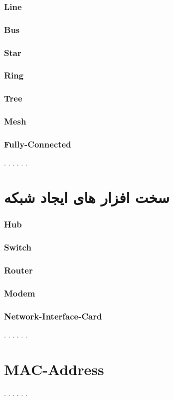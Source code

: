 \documentclass[12pt]{book}
\begin{document}
\subsubsection{Line}
\subsubsection{Bus}
\subsubsection{Star}
\subsubsection{Ring}
\subsubsection{Tree}
\subsubsection{Mesh}
\subsubsection{Fully-Connected}
. . . . . .
\section{سخت افزار های ایجاد شبکه}
\subsubsection{Hub}
\subsubsection{Switch}
\subsubsection{Router}
\subsubsection{Modem}
\subsubsection{Network-Interface-Card}
. . . . . .
\section{MAC-Address}
. . . . . .
\end{document}
